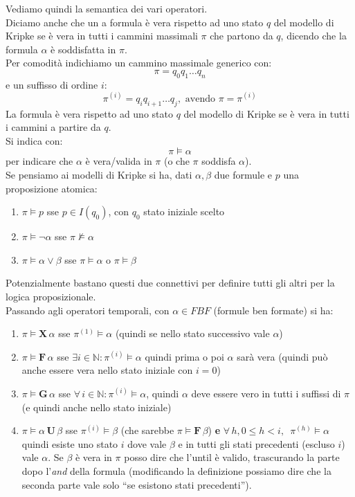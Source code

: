 \documentclass[a4paper,12pt, oneside]{book}
\begin{document}
\begin{definizione}
  Vediamo quindi la semantica dei vari operatori.\\
  Diciamo anche che un a formula è vera rispetto ad uno stato $q$ del modello di
  Kripke se è vera in tutti i cammini massimali $\pi$ che partono da $q$,
  dicendo che la formula $\alpha$ è soddisfatta in $\pi$.\\
  Per comodità indichiamo un cammino massimale generico con:
  \[\pi=q_0q_1\ldots q_n\]
  e un suffisso di ordine $i$:
  \[\pi^{(i)}=q_iq_{i+1}\ldots q_j,\mbox{ avendo }\pi=\pi^{(i)}\]
  La formula è vera rispetto ad uno stato $q$ del modello di Kripke se è vera in
  tutti i cammini a partire da $q$.\\
  Si indica con:
  \[\pi\vDash\alpha\]
  per indicare che $\alpha$ è vera/valida in $\pi$ (o che $\pi$ soddisfa
  $\alpha$).\\
  
  Se pensiamo ai modelli di Kripke si ha, dati $\alpha,\beta$ due formule e $p$
  una proposizione atomica:
  \begin{enumerate}
    \item $\pi\vDash p$ sse $p\in I(q_0)$, con $q_0$ stato iniziale scelto
    \item $\pi\vDash \neg \alpha$  sse $\pi\not\vDash \alpha$
    \item $\pi\vDash \alpha\lor\beta$ sse $\pi\vDash \alpha$ o $\pi\vDash \beta$
  \end{enumerate}
  Potenzialmente bastano questi due connettivi per definire tutti gli altri per
  la logica proposizionale. \\
  Passando agli operatori temporali, con $\alpha\in FBF$ (formule ben formate)
  si ha:
  \begin{enumerate}
    \item $\pi\vDash\mathbf{X}\,\alpha$ sse $\pi^{(1)}\vDash \alpha$ (quindi se
    nello stato successivo vale $\alpha$)
    \item $\pi\vDash\mathbf{F}\,\alpha$ sse $\exists
    i\in\mathbb{N}:\pi^{(i)}\vDash  \alpha$ quindi prima o poi $\alpha$ sarà
    vera (quindi può anche essere vera nello stato iniziale con $i=0$)
    \item $\pi\vDash\mathbf{G}\,\alpha$ sse $\forall\, i\in
    \mathbb{N}:\pi^{(i)}\vDash \alpha$, quindi $\alpha$ deve essere vero in
    tutti i suffissi di $\pi$ (e quindi anche nello stato iniziale)
    \item $\pi\vDash\alpha\,\mathbf{U}\,\beta$ sse $\pi^{(i)}\vDash \beta$ (che
    sarebbe $\pi\vDash\mathbf{F}\,\beta$) \textbf{e} $\forall\,h, 0\leq
    h<i,\,\,\, \pi^{(h)}\vDash \alpha$ quindi esiste uno stato $i$ dove vale
    $\beta$ e in tutti gli stati precedenti (escluso $i$) vale $\alpha$. Se
    $\beta$ è vera in $\pi$ posso dire che l'until è valido, trascurando la
    parte dopo l'\textit{and} della formula (modificando la definizione possiamo
    dire che la seconda parte vale solo ``se esistono stati precedenti'').
  \end{enumerate}
\end{definizione}
\end{document}
